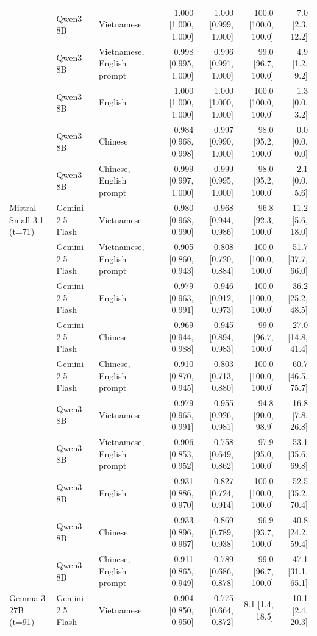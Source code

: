 \begin{tabular}{lllrrrr}
 & Qwen3-8B & Vietnamese & 1.000 [1.000, 1.000] & 1.000 [0.999, 1.000] & 100.0 [100.0, 100.0] & 7.0 [2.3, 12.2] \\
 & Qwen3-8B & Vietnamese, English prompt & 0.998 [0.995, 1.000] & 0.996 [0.991, 1.000] & 99.0 [96.7, 100.0] & 4.9 [1.2, 9.2] \\
 & Qwen3-8B & English & 1.000 [1.000, 1.000] & 1.000 [1.000, 1.000] & 100.0 [100.0, 100.0] & 1.3 [0.0, 3.2] \\
 & Qwen3-8B & Chinese & 0.984 [0.968, 0.998] & 0.997 [0.990, 1.000] & 98.0 [95.2, 100.0] & 0.0 [0.0, 0.0] \\
 & Qwen3-8B & Chinese, English prompt & 0.999 [0.997, 1.000] & 0.999 [0.995, 1.000] & 98.0 [95.2, 100.0] & 2.1 [0.0, 5.6] \\
\addlinespace
Mistral Small 3.1 (t=71) & Gemini 2.5 Flash & Vietnamese & 0.980 [0.968, 0.990] & 0.968 [0.944, 0.986] & 96.8 [92.3, 100.0] & 11.2 [5.6, 18.0] \\
 & Gemini 2.5 Flash & Vietnamese, English prompt & 0.905 [0.860, 0.943] & 0.808 [0.720, 0.884] & 100.0 [100.0, 100.0] & 51.7 [37.7, 66.0] \\
 & Gemini 2.5 Flash & English & 0.979 [0.963, 0.991] & 0.946 [0.912, 0.973] & 100.0 [100.0, 100.0] & 36.2 [25.2, 48.5] \\
 & Gemini 2.5 Flash & Chinese & 0.969 [0.944, 0.988] & 0.945 [0.894, 0.983] & 99.0 [96.7, 100.0] & 27.0 [14.8, 41.4] \\
 & Gemini 2.5 Flash & Chinese, English prompt & 0.910 [0.870, 0.945] & 0.803 [0.713, 0.880] & 100.0 [100.0, 100.0] & 60.7 [46.5, 75.7] \\
 & Qwen3-8B & Vietnamese & 0.979 [0.965, 0.991] & 0.955 [0.926, 0.981] & 94.8 [90.0, 98.9] & 16.8 [7.8, 26.8] \\
 & Qwen3-8B & Vietnamese, English prompt & 0.906 [0.853, 0.952] & 0.758 [0.649, 0.862] & 97.9 [95.0, 100.0] & 53.1 [35.6, 69.8] \\
 & Qwen3-8B & English & 0.931 [0.886, 0.970] & 0.827 [0.724, 0.914] & 100.0 [100.0, 100.0] & 52.5 [35.2, 70.4] \\
 & Qwen3-8B & Chinese & 0.933 [0.896, 0.967] & 0.869 [0.789, 0.938] & 96.9 [93.7, 100.0] & 40.8 [24.2, 59.4] \\
 & Qwen3-8B & Chinese, English prompt & 0.911 [0.865, 0.949] & 0.789 [0.686, 0.878] & 99.0 [96.7, 100.0] & 47.1 [31.1, 65.1] \\
\addlinespace
Gemma 3 27B (t=91) & Gemini 2.5 Flash & Vietnamese & 0.904 [0.850, 0.950] & 0.775 [0.664, 0.872] & 8.1 [1.4, 18.5] & 10.1 [2.4, 20.3] \\

\end{tabular}
